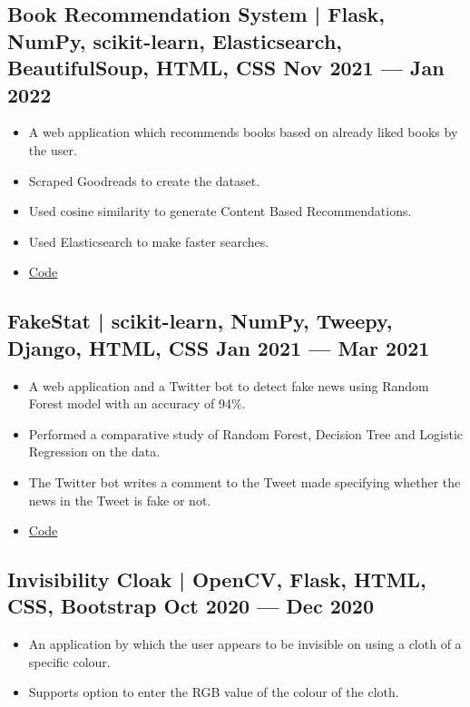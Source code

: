 \documentclass[10pt]{article}
\newenvironment{zitemize}{
\begin{itemize}\itemsep2pt \parskip0pt \parsep1pt}
{\end{itemize}\vspace{-0.7cm}}
\begin{document}
\subsection*{Book Recommendation System | Flask, NumPy, scikit-learn, Elasticsearch, BeautifulSoup, HTML, CSS  \hfill Nov 2021 --- Jan 2022
}
    \begin{zitemize}
    \item A web application which recommends books based on already liked books by the user.
     \item Scraped  Goodreads to create the dataset.
        \item Used cosine similarity to generate Content Based Recommendations.
        \item Used Elasticsearch to make faster searches.
       \item \href{https://github.com/mihikagaonkar/book-recommender-system}{Code}
    \end{zitemize}
\subsection*{FakeStat | scikit-learn, NumPy, Tweepy, Django, HTML, CSS \hfill Jan 2021 --- Mar 2021} 
    \begin{zitemize}
        \item A web application and a Twitter bot to detect fake news using Random Forest model with an accuracy of 94\%.
        \item Performed a comparative study of Random Forest, Decision Tree and Logistic Regression on the data.
        \item The Twitter bot writes a comment to the Tweet made specifying whether the news in the Tweet is fake or not.
        
        \item \href{https://github.com/mihikagaonkar/FakeStat}{Code}
    \end{zitemize}
\subsection*{Invisibility Cloak | OpenCV, Flask, HTML, CSS, Bootstrap \hfill Oct 2020 --- Dec 2020} 
    \begin{zitemize}
        \item An application by which the user appears to be invisible on using a cloth of a specific colour.
        \item Supports option to enter the RGB value of the colour of the cloth.
    \end{zitemize}
\end{document}
